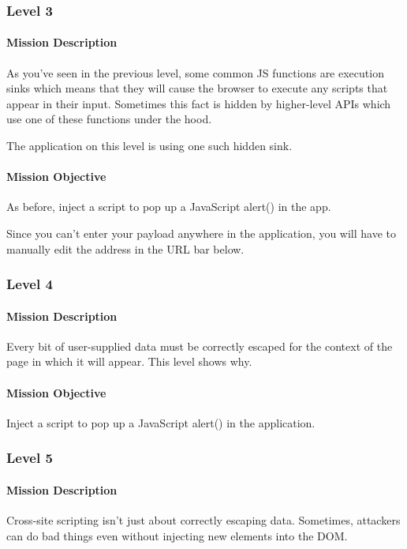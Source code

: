 \begin{Exercise}[label={websec-xss-game}]
	\subsubsection{Level 3}
		\paragraph{Mission Description}
		As you've seen in the previous level, some common JS functions are execution sinks which means that they will cause the browser to execute any scripts that appear in their input. Sometimes this fact is hidden by higher-level APIs which use one of these functions under the hood. 
		
		The application on this level is using one such hidden sink.
	
		\paragraph{Mission Objective}
		As before, inject a script to pop up a JavaScript alert() in the app. 
		
		Since you can't enter your payload anywhere in the application, you will have to manually edit the address in the URL bar below.
	
	\subsubsection{Level 4}
		\paragraph{Mission Description}
		Every bit of user-supplied data must be correctly escaped for the context of the page in which it will appear. This level shows why.
	
		\paragraph{Mission Objective}
		Inject a script to pop up a JavaScript alert() in the application.
	
	\subsubsection{Level 5}
		\paragraph{Mission Description}
		Cross-site scripting isn't just about correctly escaping data. Sometimes, attackers can do bad things even without injecting new elements into the DOM.
	

\end{Exercise}
